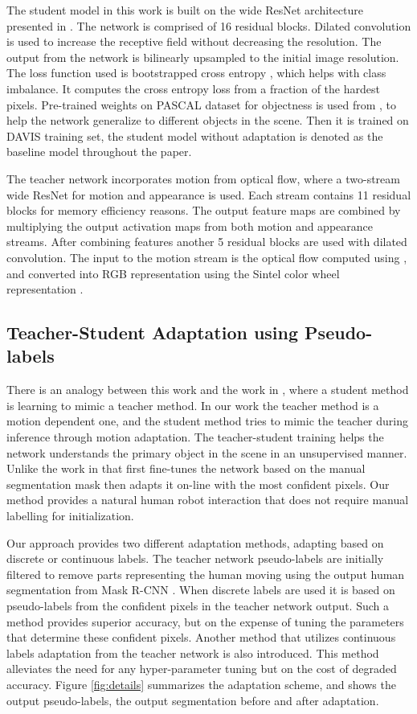 \documentclass[letterpaper, 10 pt, conference]{ieeeconf}
\begin{document}
The student model in this work is built on the wide ResNet architecture presented in \cite{wu2016wider}. The network is comprised of 16 residual blocks. Dilated convolution \cite{yu2015multi} is used to increase the receptive field without decreasing the resolution. The output from the network is bilinearly upsampled to the initial image resolution. The loss function used is bootstrapped cross entropy \cite{wu2016bridging}, which helps with class imbalance. It computes the cross entropy loss from a fraction of the hardest pixels. Pre-trained weights on PASCAL dataset for objectness is used from \cite{voigtlaender2017online}, to help the network generalize to different objects in the scene. Then it is trained on DAVIS training set, the student model without adaptation is denoted as the baseline model throughout the paper.

The teacher network incorporates motion from optical flow, where a two-stream wide ResNet for motion and appearance is used. Each stream contains 11 residual blocks for memory efficiency reasons. The output feature maps are combined by multiplying the output activation maps from both motion and appearance streams. After combining features another 5 residual blocks are used with dilated convolution. The input to the motion stream is the optical flow computed using \cite{liu2009beyond}, and converted into RGB representation using the Sintel color wheel representation \cite{baker2011database}.

\subsection{Teacher-Student Adaptation using Pseudo-labels}
There is an analogy between this work and the work in \cite{urban2016deep}, where a student method is learning to mimic a teacher method. In our work the teacher method is a motion dependent one, and the student method tries to mimic the teacher during inference through motion adaptation. The teacher-student training helps the network understands the primary object in the scene in an unsupervised manner. Unlike the work in \cite{voigtlaender2017online} that first fine-tunes the network based on the manual segmentation mask then adapts it on-line with the most confident pixels. Our method provides a natural human robot interaction that does not require manual labelling for initialization.

Our approach provides two different adaptation methods, adapting based on discrete or continuous labels. The teacher network pseudo-labels are initially filtered to remove parts representing the human moving using the output human segmentation from Mask R-CNN \cite{he2017mask}. When discrete labels are used it is based on pseudo-labels from the confident pixels in the teacher network output. Such a method provides superior accuracy, but on the expense of tuning the parameters that determine these confident pixels. Another method that utilizes continuous labels adaptation from the teacher network is also introduced. This method alleviates the need for any hyper-parameter tuning but on the cost of degraded accuracy. Figure \ref{fig:details} summarizes the adaptation scheme, and shows the output pseudo-labels, the output segmentation before and after adaptation.
\end{document}
